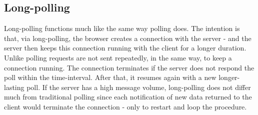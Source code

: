 \subsection{Long-polling}


Long-polling functions much like the same way polling does. The intention is that, via long-polling, the browser creates a connection with the server - and the server then keeps this connection running with the client for a longer duration\cite{lubbersgreco}. Unlike polling requests are not sent repeatedly, in the same way, to keep a connection running\cite{lubbersgreco}. The connection terminates if the server does not respond the poll within the time-interval. After that, it resumes again with a new longer-lasting poll\cite{lubbersgreco}. If the server has a high message volume, long-polling does not differ much from traditional polling since each notification of new data returned to the client would terminate the connection - only to restart and loop the procedure\cite{lubbersgreco}.